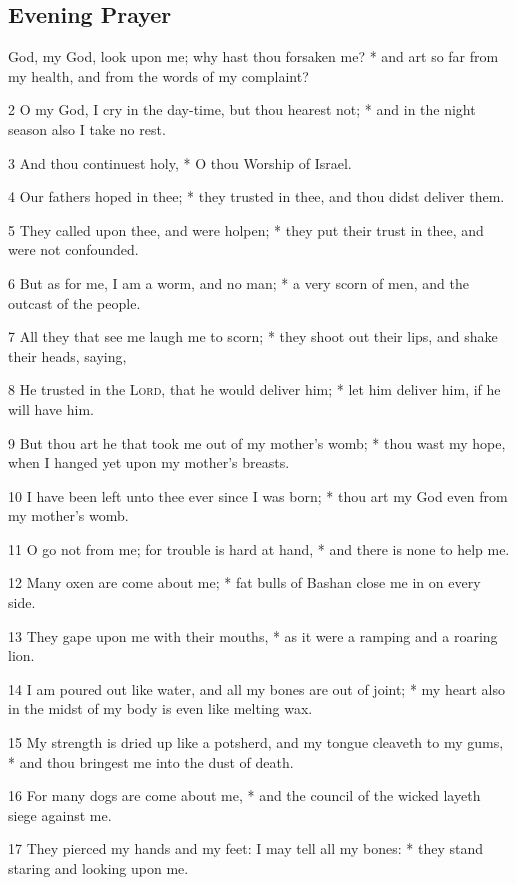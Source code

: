 \subsection{Evening Prayer}
 God, my God, look upon me; why hast thou forsaken me? * and art so far from my health, and from the words of my complaint?\par
2 O my God, I cry in the day-time, but thou hearest not; * and in the night season also I take no rest.\par
3 And thou continuest holy, * O thou Worship of Israel.\par
4 Our fathers hoped in thee; * they trusted in thee, and thou didst deliver them.\par
5 They called upon thee, and were holpen; * they put their trust in thee, and were not confounded.\par
6 But as for me, I am a worm, and no man; * a very scorn of men, and the outcast of the people.\par
7 All they that see me laugh me to scorn; * they shoot out their lips, and shake their heads, saying,\par
8 He trusted in the {\textsc{Lord}}, that he would deliver him; * let him deliver him, if he will have him.\par
9 But thou art he that took me out of my mother's womb; * thou wast my hope, when I hanged yet upon my mother's breasts.\par
10 I have been left unto thee ever since I was born; * thou art my God even from my mother's womb.\par
11 O go not from me; for trouble is hard at hand, * and there is none to help me.\par
12 Many oxen are come about me; * fat bulls of Bashan close me in on every side.\par
13 They gape upon me with their mouths, * as it were a ramping and a roaring lion.\par
14 I am poured out like water, and all my bones are out of joint; * my heart also in the midst of my body is even like melting wax.\par
15 My strength is dried up like a potsherd, and my tongue cleaveth to my gums, * and thou bringest me into the dust of death.\par
16 For many dogs are come about me, * and the council of the wicked layeth siege against me.\par
17 They pierced my hands and my feet: I may tell all my bones: * they stand staring and looking upon me.\par

